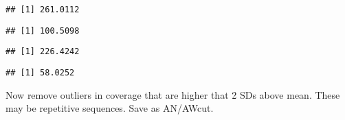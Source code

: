 \documentclass[
]{article}
\newenvironment{Shaded}{\begin{snugshade}}{\end{snugshade}}
\newcommand{\DecValTok}[1]{\textcolor[rgb]{0.00,0.00,0.81}{#1}}
\newcommand{\FunctionTok}[1]{\textcolor[rgb]{0.13,0.29,0.53}{\textbf{#1}}}
\newcommand{\NormalTok}[1]{#1}
\newcommand{\OtherTok}[1]{\textcolor[rgb]{0.56,0.35,0.01}{#1}}
\newcommand{\SpecialCharTok}[1]{\textcolor[rgb]{0.81,0.36,0.00}{\textbf{#1}}}
\begin{document}
\begin{verbatim}
## [1] 261.0112
\end{verbatim}

\begin{Shaded}
\end{Shaded}

\begin{verbatim}
## [1] 100.5098
\end{verbatim}

\begin{Shaded}
\end{Shaded}

\begin{verbatim}
## [1] 226.4242
\end{verbatim}

\begin{Shaded}
\end{Shaded}

\begin{verbatim}
## [1] 58.0252
\end{verbatim}

\begin{Shaded}
\end{Shaded}

Now remove outliers in coverage that are higher that 2 SDs above mean.
These may be repetitive sequences. Save as AN/AWcut.
\end{document}
